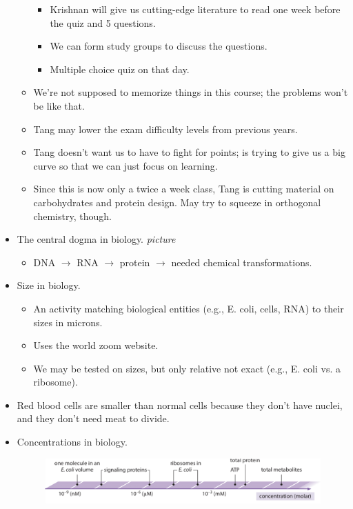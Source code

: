 \documentclass[../notes.tex]{subfiles}
\begin{document}
\begin{itemize}
\begin{itemize}
\begin{itemize}
            \item Krishnan will give us cutting-edge literature to read one week before the quiz and 5 questions.
            \item We can form study groups to discuss the questions.
            \item Multiple choice quiz on that day.
        \end{itemize}
        \item We're not supposed to memorize things in this course; the problems won't be like that.
        \item Tang may lower the exam difficulty levels from previous years.
        \item Tang doesn't want us to have to fight for points; is trying to give us a big curve so that we can just focus on learning.
        \item Since this is now only a twice a week class, Tang is cutting material on carbohydrates and protein design. May try to squeeze in orthogonal chemistry, though.
    \end{itemize}
    \item The central dogma in biology.
    \emph{picture}
    \begin{itemize}
        \item DNA $\to$ RNA $\to$ protein $\to$ needed chemical transformations.
    \end{itemize}
    \item Size in biology.
    \begin{itemize}
        \item An activity matching biological entities (e.g., E. coli, cells, RNA) to their sizes in microns.
        \item Uses the world zoom website.
        \item We may be tested on sizes, but only relative not exact (e.g., E. coli vs. a ribosome).
    \end{itemize}
    \item Red blood cells are smaller than normal cells because they don't have nuclei, and they don't need meat to divide.
    \item Concentrations in biology.
    \begin{figure}[h!]
        \centering
        \includegraphics[width=0.9\linewidth]{../ExtFiles/bioConcentrations.png}

\end{figure}
\end{itemize}
\end{document}
